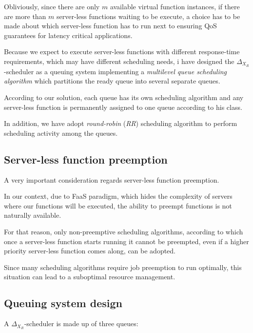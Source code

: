 \documentclass[10pt,a4paper]{article}
\theoremstyle{definition}
\begin{document}
Obliviously, since there are only $m$ available virtual function instances, if there are more than $m$ server-less functions waiting to be execute, a choice has to be made about which server-less function has to run next to ensuring QoS guarantees for latency critical applications.

Because we expect to execute server-less functions with different response-time requirements, which may have different scheduling needs, i have designed the $\Delta_{X_{R}}$-scheduler as a queuing system implementing a \textit{multilevel queue scheduling algorithm} which partitions the ready queue into several separate queues. 

According to our solution, each queue has its own scheduling algorithm and any server-less function is permanently assigned to one queue according to his class.

In addition, we have adopt \textit{round-robin} (\textit{RR}) scheduling algorithm to perform scheduling activity among the queues.

\subsection{Server-less function preemption}

A very important consideration regards server-less function preemption. 

In our context, due to FaaS paradigm, which hides the complexity of servers where our functions will be executed, the ability to preempt functions is not naturally available.

For that reason, only non-preemptive scheduling algorithms, according to which once a server-less function starts running it cannot be preempted, even if a higher priority server-less function comes along, can be adopted.

Since many scheduling algorithms require job preemption to run optimally, this situation can lead to a suboptimal resource management. 

\subsection{Queuing system design}

A $\Delta_{X_{R}}$-scheduler is made up of three queues:
\end{document}
